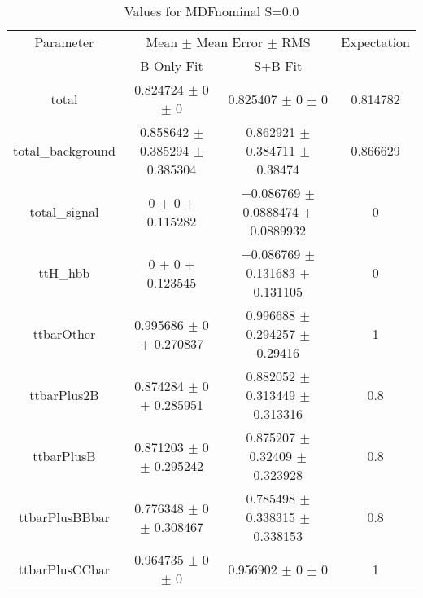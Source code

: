 \begin{table}
\centering
\caption{Values for MDFnominal S=0.0}
\begin{tabular}{cccc}
\toprule
Parameter & \multicolumn{2}{c}{Mean $\pm$ Mean Error $\pm$ RMS} & Expectation\\
 & B-Only Fit & S+B Fit & \\
\midrule
total & \num{0.824724} $\pm$ \num{0} $\pm$ \num{0} & \num{0.825407} $\pm$ \num{0} $\pm$ \num{0} & \num{0.814782}\\
total\_background & \num{0.858642} $\pm$ \num{0.385294} $\pm$ \num{0.385304} & \num{0.862921} $\pm$ \num{0.384711} $\pm$ \num{0.38474} & \num{0.866629}\\
total\_signal & \num{0} $\pm$ \num{0} $\pm$ \num{0.115282} & \num{-0.086769} $\pm$ \num{0.0888474} $\pm$ \num{0.0889932} & \num{0}\\
ttH\_hbb & \num{0} $\pm$ \num{0} $\pm$ \num{0.123545} & \num{-0.086769} $\pm$ \num{0.131683} $\pm$ \num{0.131105} & \num{0}\\
ttbarOther & \num{0.995686} $\pm$ \num{0} $\pm$ \num{0.270837} & \num{0.996688} $\pm$ \num{0.294257} $\pm$ \num{0.29416} & \num{1}\\
ttbarPlus2B & \num{0.874284} $\pm$ \num{0} $\pm$ \num{0.285951} & \num{0.882052} $\pm$ \num{0.313449} $\pm$ \num{0.313316} & \num{0.8}\\
ttbarPlusB & \num{0.871203} $\pm$ \num{0} $\pm$ \num{0.295242} & \num{0.875207} $\pm$ \num{0.32409} $\pm$ \num{0.323928} & \num{0.8}\\
ttbarPlusBBbar & \num{0.776348} $\pm$ \num{0} $\pm$ \num{0.308467} & \num{0.785498} $\pm$ \num{0.338315} $\pm$ \num{0.338153} & \num{0.8}\\
ttbarPlusCCbar & \num{0.964735} $\pm$ \num{0} $\pm$ \num{0} & \num{0.956902} $\pm$ \num{0} $\pm$ \num{0} & \num{1}\\
\bottomrule
\end{tabular}
\end{table}